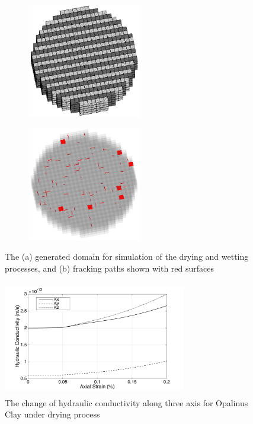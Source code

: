 \begin{figure}[!ht]
\begin{subfigure}[c]{0.5\textwidth}
\centering
\includegraphics[width=5cm,height=5cm]{figures/Amir_ME6_Lattice_Setup.png}
\subcaption{}
\label{fig:Amir_ME6_Lattice_Setup}
\end{subfigure}
\begin{subfigure}[c]{0.5\textwidth}
\centering
\includegraphics[width=5cm,height=5cm]{figures/Amir_ME6_Lattice_Frack.png}
\subcaption{}
\label{fig:Amir_ME6_Lattice_Frack}
\end{subfigure}
\caption{The (a) generated domain for simulation of the drying and wetting processes, and (b) fracking paths shown with red surfaces}
\end{figure}

\begin{figure}[!ht]
\centering
\includegraphics[width=8cm,height=5cm]{figures/Amir_ME6_Lattice_Drying.png}
\caption{The change of hydraulic conductivity along three axis for Opalinus Clay under drying process}
\label{fig:Amir_ME6_Lattice_Drying}
\end{figure} 

